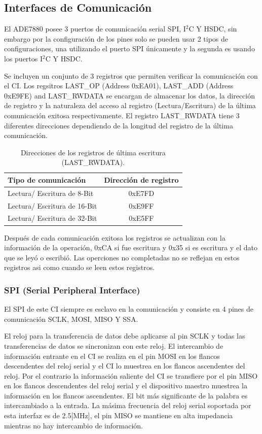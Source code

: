 \documentclass[letterpaper,12pt,oneside]{book}
\begin{document}
			\subsection{Interfaces de Comunicación}
			El ADE7880 posee 3 puertos de comunicación serial SPI, I$^2$C Y HSDC, sin embargo por la configuración de los pines solo se pueden usar 2 tipos de configuraciones, una utilizando el puerto SPI únicamente y la segunda es usando los puertos I$^2$C Y HSDC.

			Se incluyen un conjunto de 3 registros que permiten verificar la comunicación con el CI. Los regsitros LAST\_OP (Address 0xEA01), LAST\_ADD (Address 0xE9FE) and LAST\_RWDATA se encargan de almacenar los datos, la dirección de registro y la naturaleza del acceso al registro (Lectura/Escritura) de la última comunicación exitosa respectivamente. El registro LAST\_RWDATA tiene 3 diferentes direcciones dependiendo de la longitud del registro de la última comunicación.

			\begin{table}[!htpb]
				\centering
				\begin{tabular}{ l | c }
					\textbf{Tipo de comunicación} & \textbf{Dirección de registro} \\
					\hline
					Lectura/ Escritura de 8-Bit & 0xE7FD \\
					Lectura/ Escritura de 16-Bit & 0xE9FF \\
					Lectura/ Escritura de 32-Bit & 0xE5FF \\
				\end{tabular}
				\caption[Registros de última escritura]{Direcciones de los registros de última escritura (LAST\_RWDATA).}
			\end{table}

			Después de cada comunicación exitosa los registros se actualizan con la información de la operación, 0xCA si fue escritura y 0x35 si es escritura y el dato que se leyó o escribió. Las operciones no completadas no se reflejan en estos registros asi como cuando se leen estos registros.

			\subsubsection{SPI (Serial Peripheral Interface)}
			El SPI de este CI siempre es esclavo en la comunicación y consiste en 4 pines de comunicación SCLK, MOSI, MISO Y SSA.

			El reloj para la transferencia de datos debe aplicarse al pin SCLK y todas las transferencias de datos se sincronizan con este reloj. El intercambio de información entrante en el CI se realiza en el pin MOSI en los flancos descendentes del reloj serial y el CI lo muestrea en los flancos ascendentes del reloj. Por el contrario la información saliente del CI se transfiere por el pin MISO en los flancos descendentes del reloj serial y el dispositivo maestro muestrea la información en los flancos ascendentes. El bit más significante de la palabra es intercambiado a la entrada. La másima frecuencia del reloj serial soportada por esta interfaz es de 2.5[MHz], el pin MISO se mantiene en alta impedancia mientras no hay intercambio de información.
\end{document}
